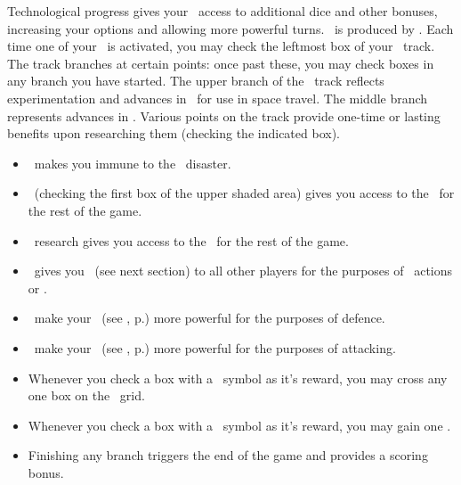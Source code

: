 Technological progress gives your \planet\ access to additional dice and other
bonuses, increasing your options and allowing more powerful turns.  \tech\ is 
produced by \labs.  Each time one of your \labs\ is activated, you may check the
leftmost box of your \tech\ track.
The track branches at certain points: once past these, you may check boxes in 
any branch you have started.  The upper branch of the \antimatter\ track 
reflects experimentation and advances in \antimatter\ for use in space travel.  
The middle branch represents advances in \engineering.
\newline\newline
Various points on the track provide one-time or lasting benefits upon 
researching them (checking the indicated box).
\begin{itemize}
  \item \cure\ makes you immune to the \pandemic\ disaster.
  \item \antimatter\ (checking the first box of the upper shaded area) gives you
        access to the \bluedie\ for the rest of the game.
  \item \engineering\ research gives you access to the \blackdie\ for the rest 
        of the game.
  \item \warpdrive\ gives you \reach\ (see next section) to all other players 
        for the purposes of \military\ actions or \trade.
  \item \shields\ make your \squadrons\ (see , 
        p.\pageref{sec:military}) more powerful for the purposes of defence.
  \item \lasers\ make your \squadrons\ (see , 
        p.\pageref{sec:military}) more powerful for the purposes of attacking.
  \item Whenever you check a box with a \gainculture\ symbol as it's reward, 
        you may cross any one box on the \culture\ grid.
  \item Whenever you check a box with a \gaincurrency\ symbol as it's reward, 
        you may gain one \currency.
  \item Finishing any branch triggers the end of the game and provides a scoring
        bonus.
\end{itemize}

